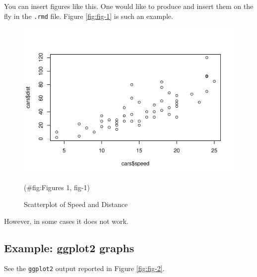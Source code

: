 \documentclass[
  12pt,
]{article}
\newenvironment{Shaded}{\begin{snugshade}}{\end{snugshade}}
\newcommand{\FunctionTok}[1]{\textcolor[rgb]{0.00,0.00,0.00}{#1}}
\newcommand{\NormalTok}[1]{#1}
\newcommand{\SpecialCharTok}[1]{\textcolor[rgb]{0.00,0.00,0.00}{#1}}
\begin{document}
You can insert figures like this. One would like to produce and insert them on
the fly in the \texttt{.rmd} file. Figure \ref{fig:fig-1} is such an example.

\begin{Shaded}
\end{Shaded}

\begin{figure}[h]

{\centering \includegraphics{articleCustomerDropoutMembership_files/figure-latex/Figures 1, fig-1-1} 

}

\caption{Scatterplot of Speed and Distance}(\#fig:Figures 1, fig-1)
\end{figure}

However, in some cases it does not work.

\hypertarget{example-ggplot2-graphs}{%
\subsection{Example: ggplot2 graphs}\label{example-ggplot2-graphs}}

See the \texttt{ggplot2} output reported in Figure \ref{fig:fig-2}.
\end{document}
